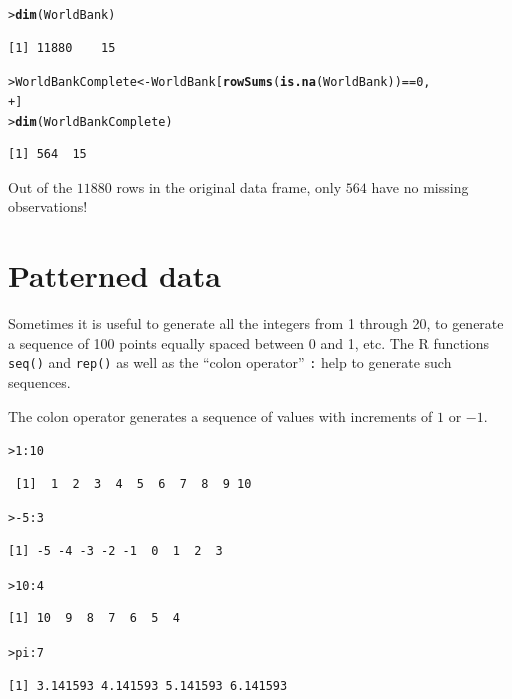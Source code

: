\documentclass[12pt,oneside]{book}\usepackage[]{graphicx}\usepackage[]{color}
\makeatletter
\newcommand{\hlnum}[1]{\textcolor[rgb]{0.686,0.059,0.569}{#1}}%
\newcommand{\hlopt}[1]{\textcolor[rgb]{0,0,0}{#1}}%
\newcommand{\hlstd}[1]{\textcolor[rgb]{0.345,0.345,0.345}{#1}}%
\newcommand{\hlkwb}[1]{\textcolor[rgb]{0.69,0.353,0.396}{#1}}%
\newcommand{\hlkwd}[1]{\textcolor[rgb]{0.737,0.353,0.396}{\textbf{#1}}}%
\newenvironment{kframe}{%
 \def\at@end@of@kframe{}%
 \ifinner\ifhmode%
  \def\at@end@of@kframe{\end{minipage}}%
  \begin{minipage}{\columnwidth}%
 \fi\fi%
 \def\FrameCommand##1{\hskip\@totalleftmargin \hskip-\fboxsep
 \colorbox{shadecolor}{##1}\hskip-\fboxsep
     \hskip-\linewidth \hskip-\@totalleftmargin \hskip\columnwidth}%
 \MakeFramed {\advance\hsize-\width
   \@totalleftmargin\z@ \linewidth\hsize
   \@setminipage}}%
 {\par\unskip\endMakeFramed%
 \at@end@of@kframe}
\newenvironment{knitrout}{}{} %
\makeatother
\begin{document}
\begin{knitrout}
\color{fgcolor}\begin{kframe}
\begin{alltt}
\hlstd{> }\hlkwd{dim}\hlstd{(WorldBank)}
\end{alltt}
\begin{verbatim}
[1] 11880    15
\end{verbatim}
\begin{alltt}
\hlstd{> }\hlstd{WorldBankComplete} \hlkwb{<-} \hlstd{WorldBank[}\hlkwd{rowSums}\hlstd{(}\hlkwd{is.na}\hlstd{(WorldBank))} \hlopt{==} \hlnum{0}\hlstd{,}
\hlstd{+ }    \hlstd{]}
\hlstd{> }\hlkwd{dim}\hlstd{(WorldBankComplete)}
\end{alltt}
\begin{verbatim}
[1] 564  15
\end{verbatim}
\end{kframe}
\end{knitrout}
Out of the $11880$ rows in the original data frame, only $564$ have no missing observations!
\section{Patterned data}
Sometimes it is useful to generate all the integers from 1 through 20, to generate a sequence of 100 points equally spaced between 0 and 1, etc. The R functions \verb+seq()+ and \verb+rep()+ as well as the ``colon operator'' \verb+:+ help to generate such sequences. 

The colon operator generates a sequence of values with increments of $1$ or $-1$.
\begin{knitrout}
\color{fgcolor}\begin{kframe}
\begin{alltt}
\hlstd{> }\hlnum{1}\hlopt{:}\hlnum{10}
\end{alltt}
\begin{verbatim}
 [1]  1  2  3  4  5  6  7  8  9 10
\end{verbatim}
\begin{alltt}
\hlstd{> }\hlopt{-}\hlnum{5}\hlopt{:}\hlnum{3}
\end{alltt}
\begin{verbatim}
[1] -5 -4 -3 -2 -1  0  1  2  3
\end{verbatim}
\begin{alltt}
\hlstd{> }\hlnum{10}\hlopt{:}\hlnum{4}
\end{alltt}
\begin{verbatim}
[1] 10  9  8  7  6  5  4
\end{verbatim}
\begin{alltt}
\hlstd{> }\hlstd{pi}\hlopt{:}\hlnum{7}
\end{alltt}
\begin{verbatim}
[1] 3.141593 4.141593 5.141593 6.141593
\end{verbatim}
\end{kframe}
\end{knitrout}
\end{document}

